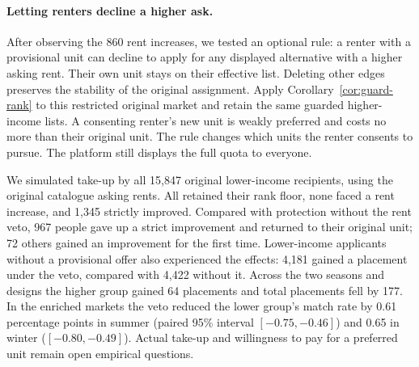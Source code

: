 \paragraph{Letting renters decline a higher ask.}
After observing the 860 rent increases, we tested an optional rule: a renter
with a provisional unit can decline to apply for any displayed alternative
with a higher asking rent. Their own unit stays on their effective list.
Deleting other edges preserves the stability of the original assignment.
Apply Corollary~\ref{cor:guard-rank} to this restricted original market
and retain the same guarded higher-income lists. A consenting renter's
new unit is weakly preferred and costs no more than their original unit.
The rule changes which units the renter consents to pursue. The platform
still displays the full quota to everyone.

We simulated take-up by all 15,847 original lower-income recipients,
using the original catalogue asking rents.
All retained their rank floor, none faced a rent increase, and 1,345 strictly
improved. Compared with protection without the rent veto, 967 people gave
up a strict improvement and returned to their original unit; 72 others gained
an improvement for the first time. Lower-income applicants without a provisional
offer also experienced the effects: 4,181 gained a placement under the veto,
compared with 4,422 without it. Across the two seasons and designs the higher
group gained 64 placements and total placements fell by 177. In the enriched
markets the veto reduced the lower group's match rate by 0.61 percentage
points in summer (paired 95\% interval $[-0.75,-0.46]$) and 0.65 in winter
($[-0.80,-0.49]$). Actual take-up and willingness to pay for a preferred
unit remain open empirical questions.
